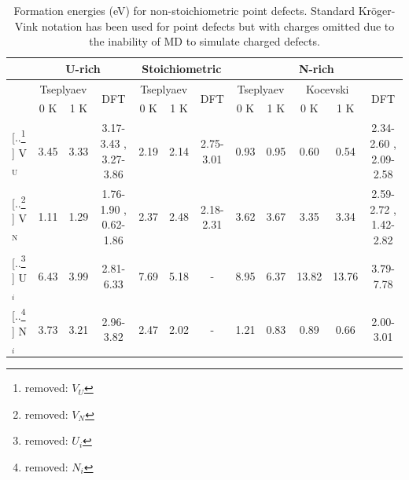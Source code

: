 \documentclass[preprint, 12pt]{elsarticle}
\providecommand{\DIFaddtex}[1]{{\protect\color{blue} \sf #1}} %
\providecommand{\DIFdeltex}[1]{{\protect\color{red} [..\footnote{removed: #1} ]}} %
\providecommand{\DIFaddFL}[1]{\DIFadd{#1}} %
\providecommand{\DIFdelFL}[1]{\DIFdel{#1}} %
\providecommand{\DIFaddbeginFL}{} %
\providecommand{\DIFaddendFL}{} %
\providecommand{\DIFdelbeginFL}{} %
\providecommand{\DIFdelendFL}{} %
\providecommand{\DIFadd}[1]{\texorpdfstring{\DIFaddtex{#1}}{#1}} %
\providecommand{\DIFdel}[1]{\texorpdfstring{\DIFdeltex{#1}}{}} %
\newcommand{\DIFscaledelfig}{0.5}
\newlength{\DIFdelgraphicswidth} %
\newlength{\DIFdelgraphicsheight} %
\newcommand{\DIFaddincludegraphics}[2][]{{\color{blue}\fbox{\DIFOincludegraphics[#1]{#2}}}} %
\newcommand{\DIFdelincludegraphics}[2][]{%
\sbox{\DIFdelgraphicsbox}{\DIFOincludegraphics[#1]{#2}}%
\settoboxwidth{\DIFdelgraphicswidth}{\DIFdelgraphicsbox} %
\settoboxtotalheight{\DIFdelgraphicsheight}{\DIFdelgraphicsbox} %
\scalebox{\DIFscaledelfig}{%
\parbox[b]{\DIFdelgraphicswidth}{\usebox{\DIFdelgraphicsbox}\\[-\baselineskip] \rule{\DIFdelgraphicswidth}{0em}}\llap{\resizebox{\DIFdelgraphicswidth}{\DIFdelgraphicsheight}{%
\setlength{\unitlength}{\DIFdelgraphicswidth}%
\begin{picture}(1,1)%
\thicklines\linethickness{2pt} %
{\color[rgb]{1,0,0}\put(0,0){\framebox(1,1){}}}%
{\color[rgb]{1,0,0}\put(0,0){\line( 1,1){1}}}%
{\color[rgb]{1,0,0}\put(0,1){\line(1,-1){1}}}%
\end{picture}%
}\hspace*{3pt}}} %
} %
\DeclareRobustCommand{\DIFaddbeginFL}{\DIFOaddbeginFL \let\includegraphics\DIFaddincludegraphics} %
\DeclareRobustCommand{\DIFaddendFL}{\DIFOaddendFL \let\includegraphics\DIFOincludegraphics} %
\DeclareRobustCommand{\DIFdelbeginFL}{\DIFOdelbeginFL \let\includegraphics\DIFdelincludegraphics} %
\DeclareRobustCommand{\DIFdelendFL}{\DIFOaddendFL \let\includegraphics\DIFOincludegraphics} %
\begin{document}
\begin{table}[h!]
\tiny 
\centering
\caption{Formation energies (eV) for non-stoichiometric point defects. Standard Kröger-Vink notation \cite{Kroger1956} has been used for point defects but with charges omitted due to the inability of MD to simulate charged defects.}
\begin{tabular}{l|cc|c|cc|c|cc|cc|c}
\hline
& \multicolumn{3}{c|}{U-rich} & \multicolumn{3}{c|}{Stoichiometric} & \multicolumn{5}{c}{N-rich} \\
\hline
& \multicolumn{2}{c|}{Tseplyaev} & \multirow{2}{*}{DFT} & \multicolumn{2}{c|}{Tseplyaev} & \multirow{2}{*}{DFT} & \multicolumn{2}{c|}{Tseplyaev} & \multicolumn{2}{c|}{Kocevski} & \multirow{2}{*}{DFT} \\
& 0 K & 1 K                &                      & 0 K & 1 K                &                      & 0 K & 1 K                & 0 K & 1 K & \\  
\hline
\DIFdelbeginFL \DIFdelFL{$V_U$ }\DIFdelendFL \DIFaddbeginFL \DIFaddFL{V$_\text{U}$ }\DIFaddendFL & 3.45            & 3.33            & 3.17-3.43 \cite{Yang2021}, 3.27-3.86  \cite{Kocevski2022I} & 2.19            & 2.14            & 2.75-3.01 \cite{Yang2021} & 0.93            & 0.95            & 0.60             & 0.54  & 2.34-2.60 \cite{Yang2021}, 2.09-2.58  \cite{Kocevski2022I} \\
\DIFdelbeginFL \DIFdelFL{$V_N$ }\DIFdelendFL \DIFaddbeginFL \DIFaddFL{V$_\text{N}$ }\DIFaddendFL & 1.11            & 1.29            & 1.76-1.90 \cite{Yang2021}, 0.62-1.86  \cite{Kocevski2022I} & 2.37            & 2.48            & 2.18-2.31 \cite{Yang2021} & 3.62            & 3.67            & 3.35             & 3.34  & 2.59-2.72 \cite{Yang2021}, 1.42-2.82  \cite{Kocevski2022I} \\
\DIFdelbeginFL \DIFdelFL{$U_i$ }\DIFdelendFL \DIFaddbeginFL \DIFaddFL{U$_i$ }\DIFaddendFL & 6.43            & 3.99            & 2.81-6.33 \cite{Kocevski2022I}                             & 7.69            & 5.18            & -                         & 8.95            & 6.37            & 13.82            & 13.76 & 3.79-7.78  \cite{Kocevski2022I} \\
\DIFdelbeginFL \DIFdelFL{$N_i$ }\DIFdelendFL \DIFaddbeginFL \DIFaddFL{N$_i$ }\DIFaddendFL & 3.73            & 3.21            & 2.96-3.82 \cite{Kocevski2022I}                             & 2.47            & 2.02            & -                         & 1.21            & 0.83            & 0.89             & 0.66  & 2.00-3.01  \cite{Kocevski2022I} \\

\end{tabular}
\end{table}
\end{document}
